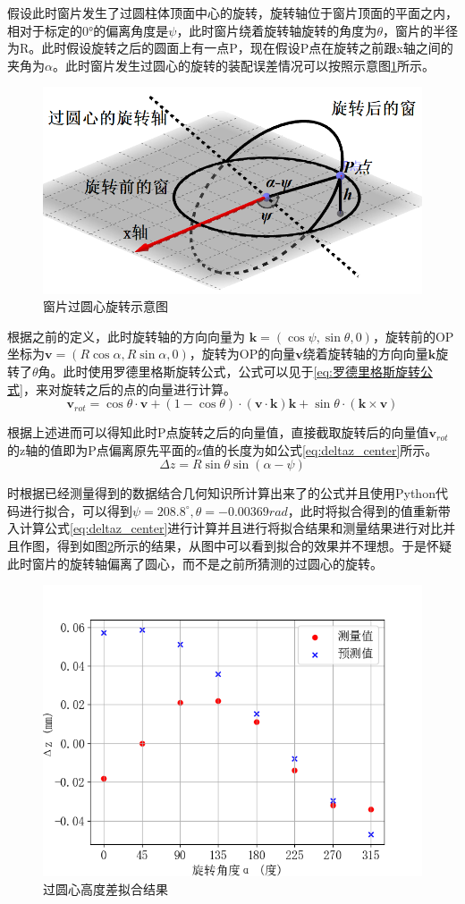 \documentclass[master]{thesis-uestc}
\begin{document}
假设此时窗片发生了过圆柱体顶面中心的旋转，旋转轴位于窗片顶面的平面之内，相对于标定的0°的偏离角度是$\psi$，此时窗片绕着旋转轴旋转的角度为$\theta$，窗片的半径为R。此时假设旋转之后的圆面上有一点P，现在假设P点在旋转之前跟x轴之间的夹角为\(\alpha \)。此时窗片发生过圆心的旋转的装配误差情况可以按照示意图\ref{fig:过圆心旋转示意图}所示。
\begin{figure}[!htb]
    \centering
    \includegraphics[width=0.5\linewidth]{pic/chapter5/过圆心旋转示意图.png}
    \caption{窗片过圆心旋转示意图}
    \label{fig:过圆心旋转示意图}
\end{figure}

根据之前的定义，此时旋转轴的方向向量为 \(\mathbf{k} = (\cos\psi, \sin \theta, 0)\)，旋转前的OP坐标为\(\mathbf{v} = (R\cos \alpha, R\sin \alpha, 0)\)，旋转为OP的向量$\mathbf{v}$绕着旋转轴的方向向量\(\mathbf{k}\)旋转了\(\theta \)角。此时使用罗德里格斯旋转公式，公式可以见于\ref{eq:罗德里格斯旋转公式}，来对旋转之后的点的向量进行计算。
\begin{equation}\label{eq:罗德里格斯旋转公式}
    \mathbf{v}_{rot} = \cos\theta \cdot \mathbf{v} + (1 - \cos\theta) \cdot (\mathbf{v} \cdot \mathbf{k}) \mathbf{k} + \sin\theta \cdot (\mathbf{k} \times \mathbf{v})
\end{equation}

根据上述进而可以得知此时P点旋转之后的向量值，直接截取旋转后的向量值\(\mathbf{v}_{rot}\)的z轴的值即为P点偏离原先平面的z值的长度为如公式\ref{eq:deltaz_center}所示。
\begin{equation}\label{eq:deltaz_center}
    \Delta z = R \sin \theta \sin \left(\alpha -\psi \right)
\end{equation}

时根据已经测量得到的数据结合几何知识所计算出来了的公式并且使用Python代码进行拟合，可以得到\( \psi = 208.8 ^ \circ, \theta = -0.00369rad \)，此时将拟合得到的值重新带入计算公式\ref{eq:deltaz_center}进行计算并且进行将拟合结果和测量结果进行对比并且作图，得到如图\ref{fig:过圆心高度差拟合结果}所示的结果，从图中可以看到拟合的效果并不理想。于是怀疑此时窗片的旋转轴偏离了圆心，而不是之前所猜测的过圆心的旋转。
\begin{figure}[!htb]
    \centering
    \includegraphics[width=0.5\linewidth]{pic/chapter5/过圆心高度差拟合.png}
    \caption{过圆心高度差拟合结果}
    \label{fig:过圆心高度差拟合结果}
\end{figure}
\end{document}
